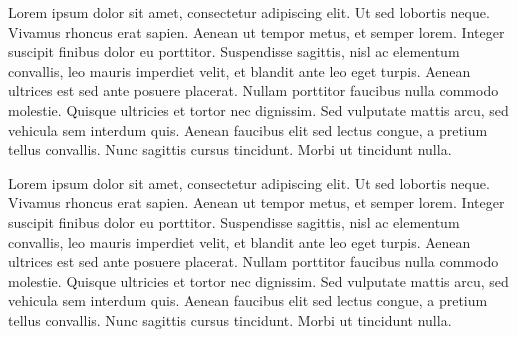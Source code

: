 Lorem ipsum dolor sit amet, consectetur adipiscing elit. Ut sed lobortis neque. Vivamus rhoncus erat sapien. Aenean ut tempor metus, et semper lorem. Integer suscipit finibus dolor eu porttitor. Suspendisse sagittis, nisl ac elementum convallis, leo mauris imperdiet velit, et blandit ante leo eget turpis. Aenean ultrices est sed ante posuere placerat. Nullam porttitor faucibus nulla commodo molestie. Quisque ultricies et tortor nec dignissim. Sed vulputate mattis arcu, sed vehicula sem interdum quis. Aenean faucibus elit sed lectus congue, a pretium tellus convallis. Nunc sagittis cursus tincidunt. Morbi ut tincidunt nulla.

Lorem ipsum dolor sit amet, consectetur adipiscing elit. Ut sed lobortis neque. Vivamus rhoncus erat sapien. Aenean ut tempor metus, et semper lorem. Integer suscipit finibus dolor eu porttitor. Suspendisse sagittis, nisl ac elementum convallis, leo mauris imperdiet velit, et blandit ante leo eget turpis. Aenean ultrices est sed ante posuere placerat. Nullam porttitor faucibus nulla commodo molestie. Quisque ultricies et tortor nec dignissim. Sed vulputate mattis arcu, sed vehicula sem interdum quis. Aenean faucibus elit sed lectus congue, a pretium tellus convallis. Nunc sagittis cursus tincidunt. Morbi ut tincidunt nulla.
